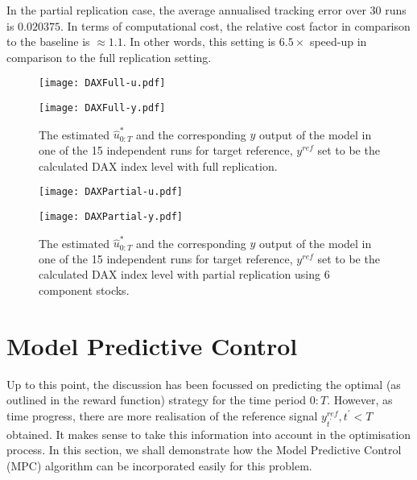 In the partial replication case, the average annualised tracking error over $30$ runs is $0.020375$. In terms of computational cost, the relative cost factor in comparison to the baseline is $\approx 1.1$. In other words, this setting is $6.5\times$ speed-up in comparison to the full replication setting.

\begin{figure}[htbp]
\centering
    \begin{minipage}{0.5\textwidth}
        \centering
        \texttt{[image: DAXFull-u.pdf]}
    \end{minipage}%
    \begin{minipage}{0.5\textwidth}
        \centering
        \texttt{[image: DAXFull-y.pdf]}
    \end{minipage}
\caption{The estimated $\hat{u}^*_{0:T}$ and the corresponding $y$ output of the model in one of the 15 independent runs for target reference, $y^{ref}$ set to be the calculated DAX index level with full replication.}
\label{fig:dax}
\end{figure}

\begin{figure}[htbp]
\centering
    \begin{minipage}{0.5\textwidth}
        \centering
        \texttt{[image: DAXPartial-u.pdf]}
    \end{minipage}%
    \begin{minipage}{0.5\textwidth}
        \centering
        \texttt{[image: DAXPartial-y.pdf]}
    \end{minipage}
\caption{The estimated $\hat{u}^*_{0:T}$ and the corresponding $y$ output of the model in one of the 15 independent runs for target reference, $y^{ref}$ set to be the calculated DAX index level with partial replication using $6$ component stocks.}
\label{fig:daxpartial}
\end{figure}

\section{Model Predictive Control}
Up to this point, the discussion has been focussed on predicting the optimal (as outlined in the reward function) strategy for the time period $0:T$. However, as time progress, there are more realisation of the reference signal $y^{ref}_{t^\prime}, t^\prime < T$ obtained. It makes sense to take this information into account in the optimisation process. In this section, we shall demonstrate how the Model Predictive Control (MPC) algorithm can be incorporated easily for this problem.

